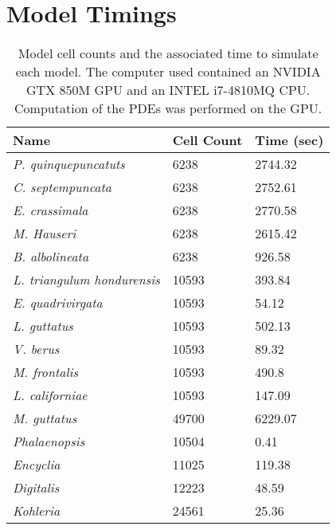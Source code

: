 \chapter{Model Timings}
\begin{table}[h]
\centering
\begin{tabular}{lll} \hline
\textbf{Name}        & \textbf{Cell Count} & \textbf{Time (sec)} \\ \hline
\textit{P. quinquepuncatuts }  & 6238                & 2744.32             \\
\textit{C. septempuncata}      & 6238                & 2752.61             \\
\textit{E. crassimala}         & 6238                & 2770.58             \\
\textit{M. Hauseri}            & 6238                & 2615.42             \\
\textit{B. albolineata}        & 6238                & 926.58              \\
\textit{L. triangulum hondurensis}          & 10593               & 393.84              \\
\textit{E. quadrivirgata}      & 10593               & 54.12               \\
\textit{L. guttatus}   & 10593               & 502.13              \\
\textit{V. berus}         & 10593               & 89.32               \\
\textit{M. frontalis}        & 10593               & 490.8               \\
\textit{L. californiae} & 10593               & 147.09              \\
\textit{M. guttatus}        & 49700               & 6229.07             \\
\textit{Phalaenopsis}  & 10504               & 0.41                \\
\textit{Encyclia}      & 11025               & 119.38              \\
\textit{Digitalis}            & 12223               & 48.59               \\
\textit{Kohleria}             & 24561               & 25.36              \\ \hline
\end{tabular}
\caption[Model cell counts and the associated time to simulate each model]{Model cell counts and the associated time to simulate each model. The computer used contained an NVIDIA GTX 850M GPU and an INTEL i7-4810MQ CPU. Computation of the PDEs was performed on the GPU.}
\label{tab:software-performance}
\end{table}